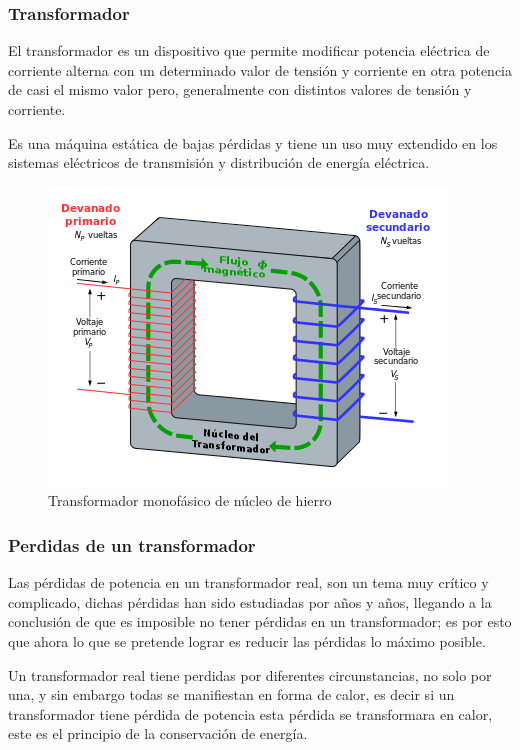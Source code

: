 \documentclass[12pt]{article}
\begin{document}
\subsubsection{Transformador}
El transformador es un dispositivo que permite modificar potencia eléctrica de corriente alterna con un determinado valor de tensión y corriente en otra potencia de casi el mismo valor pero, generalmente con distintos valores de tensión y corriente.

Es una máquina estática de bajas pérdidas y tiene un uso muy extendido en los sistemas eléctricos de transmisión y distribución de energía eléctrica.

\begin{figure}[H]
\centering
\includegraphics[scale=0.75]{src/images/Transformador.png}
\caption{Transformador monofásico de núcleo de hierro}
\label{fgr:Transformador}
\end{figure}

\subsubsection{Perdidas de un transformador}
Las pérdidas de potencia en un transformador real, son un tema muy crítico y complicado, dichas pérdidas han sido estudiadas por años y años, llegando a la conclusión de que es imposible no tener pérdidas en un transformador; es por esto que ahora lo que se pretende lograr es reducir las pérdidas lo máximo posible.

Un transformador real tiene perdidas por diferentes circunstancias, no solo por una, y sin embargo todas se manifiestan en forma de calor, es decir si un transformador tiene pérdida de potencia esta pérdida se transformara en calor, este es el principio de la conservación de energía.
\end{document}
